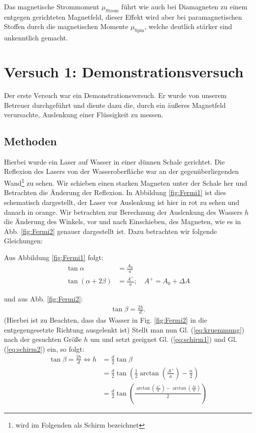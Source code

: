 \documentclass[11pt,a4paper,titlepage, ngerman]{article}
\newcommand{\refeq}[1]{Gl. (\ref{eq:#1})}
\newcommand{\reffig}[1]{Fig. \ref{fig:#1}}
\begin{document}
			Das magnetische Strommoment $\mu _\text{Strom}$ führt wie auch bei Diamagneten zu einem entgegen gerichteten Magnetfeld, dieser Effekt wird aber bei paramagnetischen Stoffen durch die magnetischen Momente $\mu _\text{Spin}$, welche deutlich stärker sind unkenntlich gemacht.
			
			

			
	\section{Versuch 1: Demonstrationsversuch} 
		
		Der erste Versuch war ein Demonstrationsversuch. Er wurde von unserem Betreuer durchgeführt und diente dazu die, durch ein äußeres Magnetfeld verursachte, Auslenkung einer Flüssigkeit zu messen.
		
		\subsection*{Methoden} 
		
		Hierbei wurde ein Laser auf Wasser in einer dünnen Schale gerichtet. Die Reflexion des Lasers von der Wasseroberfläche war an der gegenüberliegenden Wand\footnote{wird im Folgenden als Schirm bezeichnet} zu sehen. Wir schieben einen starken Magneten unter der Schale her und Betrachten die Änderung der Reflexion.
		In Abbildung \ref{fig:Fermi1} ist dies schematisch dargestellt, der Laser vor Auslenkung ist hier in rot zu sehen und danach in orange. Wir betrachten zur Berechnung der Auslenkung des Wassers $h$ die Änderung des Winkels, vor und nach Einschieben, des Magneten, wie es in Abb. \ref{fig:Fermi2} genauer dargestellt ist. Dazu betrachten wir folgende Gleichungen:
		
		Aus Abbildung \ref{fig:Fermi1} folgt:
		\begin{align}
			\tan \alpha &= \frac{A_0}{a}
			\label{eq:schirm1}\\
			\tan (\alpha + 2 \beta) &= \frac{A^+}{a};\quad A^+ = A_0+\Delta A
			\label{eq:schirm2}
		\end{align}
		
		und aus Abb. \ref{fig:Fermi2}: 
			\begin{align}
			\tan \beta = \frac{2 h}{d}.
			\label{eq:kruemmung}
		\end{align}
		(Hierbei ist zu Beachten, dass das Wasser in \reffig{Fermi2} in die entgegengesetzte Richtung ausgelenkt ist)										
		Stellt man nun \refeq{kruemmung} nach der gesuchten Größe $h$ um und setzt geeignet \refeq{schirm1} und \refeq{schirm2} ein, so folgt:	
		\begin{align}
			\tan \beta = \frac{2h}{d} \Leftrightarrow h &= \frac{d}{2} \tan \beta\\
			&= \frac{d}{2} \tan \left( \frac{1}{2}\arctan \left( \frac{A^+}{a}\right) - \frac{\alpha}{2}\right)\\
			&= \frac{d}{2} \tan \left( \frac{\arctan \left( \frac{A^+}{a}\right) - \arctan\left( \frac{A_0}{a}\right)}{2} \right) \label{eq:auslenkung}
		\end{align}
		
\end{document}
